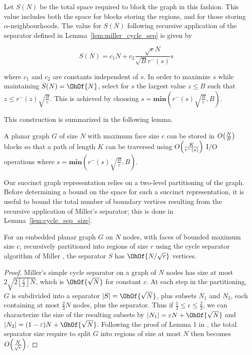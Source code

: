 Let $S(N)$ be the total space required to block 
the graph in this fashion.
This value includes both the space for blocks storing the
regions, and for those storing $\alpha$-neighbourhoods.
The value for $S(N)$ following recursive application of the 
separator defined in Lemma~\ref{lem:miller_cycle_sep} is
given by

\begin{equation}
  S(N) = c_1N + c_2\frac{\sqrt{c}N}{\sqrt{B}r^{-}(s)} s
\end{equation}

where $c_1$ and $c_2$ are constants independent of $s$.
In order to maximize $s$ while maintaining $S(N) = \OhOf{N}$,
select for $s$ the largest value $z \le B$ such that 
$z \le r^{-}(z)\sqrt{\frac{B}{c}}$.
This is achieved by choosing 
$s = \textbf{min}\left(r^{-}(s)\sqrt{\frac{B}{c}}, B \right)$.

This construction is summarized in the following lemma.

\begin{lemma}
  A planar graph $G$ of size $N$ with maximum face size $c$ 
  can be stored in
  $O\!\left( \frac{N}{B} \right)$ blocks so that a path of length $K$ can
  be traversed using $O\!\left( \frac{K}{ r^{-}(s) } \right)$ I/O operations
  where $s = \textbf{min}\left( r^{-}(s)\sqrt{\frac{B}{c}}, B \right)$.
\end{lemma}

Our succinct graph representation relies on a two-level partitioning of 
the graph.
Before determining a bound on the space for such a succinct representation,
it is useful to bound the total number of boundary vertices 
resulting from the recursive application of Miller's separator; this is 
done in Lemma~\ref{lem:cycle_sep_size}.

\begin{lemma}
  \label{lem:cycle_sep_size}
  For an embedded planar graph $G$ on $N$ nodes, with faces of
  bounded maximum size $c$, recursively partitioned into regions of
  size $r$ using the cycle separator algorithm of Miller
  \cite{miller_1986}, the separator $S$ has $\OhOf{N/\sqrt{r}}$
  vertices.
\end{lemma}

\begin{proof}
  Miller's simple cycle separator on a graph of $N$ nodes has size at
  most $2 \sqrt{ 2 \left\lfloor \frac{c}{2} \right\rfloor N}$, which
  is $\OhOf{\sqrt{N}}$ for constant $c$. At each step in the
  partitioning, $G$ is subdivided into a separator $|S| =
  \OhOf{\sqrt{N}}$, plus subsets $N_1$ and $N_2$, each containing at
  most $\frac{2}{3}N$ nodes, plus the separator. 
  Thus if $\frac{1}{3} \le \epsilon \le \frac{2}{3}$, 
  we can characterize the size of the
  resulting subsets by $|N_1| = \epsilon N + \OhOf{\sqrt{N}}$ and
  $|N_2| = (1-\epsilon)N + \OhOf{\sqrt{N}}$. Following the proof of
  Lemma 1 in \cite{Frederickson87}, the total separator size require to
  split $G$ into regions of size at most $N$ then becomes
  $O\!\left(\frac{N}{\sqrt{r}}\right)$.
\end{proof}

